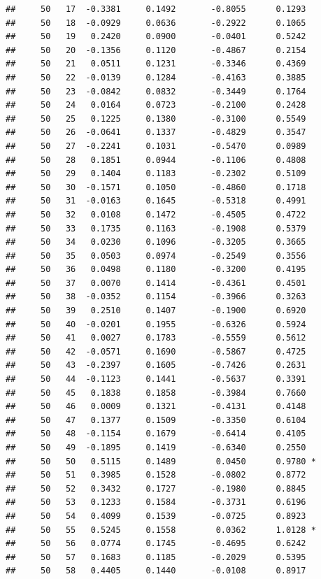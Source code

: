 \documentclass[
]{article}
\begin{document}
\begin{verbatim}
##     50   17  -0.3381     0.1492       -0.8055      0.1293  
##     50   18  -0.0929     0.0636       -0.2922      0.1065  
##     50   19   0.2420     0.0900       -0.0401      0.5242  
##     50   20  -0.1356     0.1120       -0.4867      0.2154  
##     50   21   0.0511     0.1231       -0.3346      0.4369  
##     50   22  -0.0139     0.1284       -0.4163      0.3885  
##     50   23  -0.0842     0.0832       -0.3449      0.1764  
##     50   24   0.0164     0.0723       -0.2100      0.2428  
##     50   25   0.1225     0.1380       -0.3100      0.5549  
##     50   26  -0.0641     0.1337       -0.4829      0.3547  
##     50   27  -0.2241     0.1031       -0.5470      0.0989  
##     50   28   0.1851     0.0944       -0.1106      0.4808  
##     50   29   0.1404     0.1183       -0.2302      0.5109  
##     50   30  -0.1571     0.1050       -0.4860      0.1718  
##     50   31  -0.0163     0.1645       -0.5318      0.4991  
##     50   32   0.0108     0.1472       -0.4505      0.4722  
##     50   33   0.1735     0.1163       -0.1908      0.5379  
##     50   34   0.0230     0.1096       -0.3205      0.3665  
##     50   35   0.0503     0.0974       -0.2549      0.3556  
##     50   36   0.0498     0.1180       -0.3200      0.4195  
##     50   37   0.0070     0.1414       -0.4361      0.4501  
##     50   38  -0.0352     0.1154       -0.3966      0.3263  
##     50   39   0.2510     0.1407       -0.1900      0.6920  
##     50   40  -0.0201     0.1955       -0.6326      0.5924  
##     50   41   0.0027     0.1783       -0.5559      0.5612  
##     50   42  -0.0571     0.1690       -0.5867      0.4725  
##     50   43  -0.2397     0.1605       -0.7426      0.2631  
##     50   44  -0.1123     0.1441       -0.5637      0.3391  
##     50   45   0.1838     0.1858       -0.3984      0.7660  
##     50   46   0.0009     0.1321       -0.4131      0.4148  
##     50   47   0.1377     0.1509       -0.3350      0.6104  
##     50   48  -0.1154     0.1679       -0.6414      0.4105  
##     50   49  -0.1895     0.1419       -0.6340      0.2550  
##     50   50   0.5115     0.1489        0.0450      0.9780 *
##     50   51   0.3985     0.1528       -0.0802      0.8772  
##     50   52   0.3432     0.1727       -0.1980      0.8845  
##     50   53   0.1233     0.1584       -0.3731      0.6196  
##     50   54   0.4099     0.1539       -0.0725      0.8923  
##     50   55   0.5245     0.1558        0.0362      1.0128 *
##     50   56   0.0774     0.1745       -0.4695      0.6242  
##     50   57   0.1683     0.1185       -0.2029      0.5395  
##     50   58   0.4405     0.1440       -0.0108      0.8917  

\end{verbatim}
\end{document}
